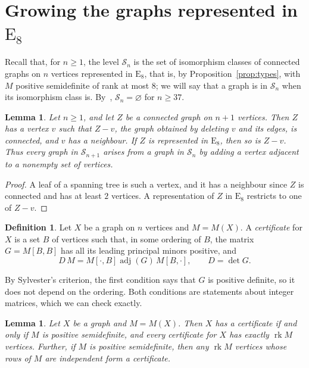 \documentclass[11pt]{article}
\newcommand\cS{{\mathcal S}}
\newcommand\opk[1]{\mathop{\mathrm{#1}}\nolimits}
\newcommand\rk{\opk{rk}}
\newtheorem{lemma}[theorem]{Lemma}
\theoremstyle{definition}
\newtheorem{definition}[theorem]{Definition}
\newcommand{\typ}[1]{\mathrm{#1}}
\begin{document}
\section{Growing the graphs represented in \texorpdfstring{$\typ E_8$}{E8}}\label{sec:growth}

Recall that, for $n\ge1$, the level $\cS_n$ is the set of isomorphism classes of connected graphs
on $n$ vertices represented in $\typ E_8$, that is, by Proposition~\ref{prop:types}, with $M$
positive semidefinite of rank at most $8$; we will say that a graph is in $\cS_n$ when its
isomorphism class is. By~\cite[Theorem~4.3]{CGSS}, $\cS_n=\varnothing$ for $n\ge37$.

\begin{lemma}\label{lem:noncut}
Let $n\ge1$, and let $Z$ be a connected graph on $n+1$ vertices. Then $Z$ has a vertex $v$ such
that $Z-v$, the graph obtained by deleting $v$ and its edges, is connected, and $v$ has a
neighbour. If $Z$ is represented in $\typ E_8$, then so
is $Z-v$. Thus every graph in $\cS_{n+1}$ arises from a graph in $\cS_n$ by adding a vertex
adjacent to a nonempty set of vertices.
\end{lemma}

\begin{proof}
A leaf of a spanning tree is such a vertex, and it has a neighbour since $Z$ is connected and has
at least $2$ vertices. A representation of $Z$ in $\typ E_8$ restricts to one of $Z-v$.
\end{proof}

\begin{definition}\label{def:certificate}
Let $X$ be a graph on $n$ vertices and $M=M(X)$. A \textsl{certificate} for $X$ is a set $B$ of
vertices such that, in some ordering of $B$, the matrix $G=M[B,B]$ has all its leading principal
minors positive, and
\[
D\,M=M[\cdot,B]\operatorname{adj}(G)\,M[B,\cdot],\qquad D=\det G.
\]
\end{definition}

By Sylvester's criterion, the first condition says that $G$ is positive definite, so it does not
depend on the ordering. Both conditions are statements about integer matrices, which we can
check exactly.

\begin{lemma}\label{lem:certificate}
Let $X$ be a graph and $M=M(X)$. Then $X$ has a certificate if and only if $M$ is positive
semidefinite, and every certificate for $X$ has exactly $\rk M$ vertices. Further, if $M$ is
positive semidefinite, then any $\rk M$ vertices whose rows of $M$ are independent form a
certificate.
\end{lemma}
\end{document}
